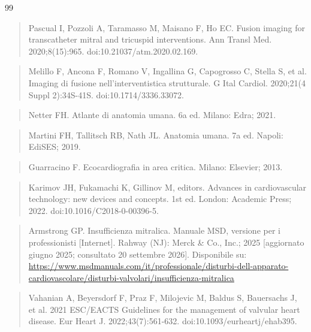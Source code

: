 \documentclass[12pt,a4paper,twoside]{article}
\providecommand{\ul}[1]{#1}
\begin{document}
\begin{thebibliography}{99}
  \begin{quote}
  Pascual I, Pozzoli A, Taramasso M, Maisano F, Ho EC. Fusion imaging for transcatheter mitral and tricuspid interventions. Ann Transl Med. 2020;8(15):965. doi:10.21037/atm.2020.02.169.
  \end{quote}
  \begin{quote}
  Melillo F, Ancona F, Romano V, Ingallina G, Capogrosso C, Stella S, et al. Imaging di fusione nell'interventistica strutturale. G Ital Cardiol. 2020;21(4 Suppl 2):34S-41S. doi:10.1714/3336.33072.
  \end{quote}
  \begin{quote}
  Netter FH. Atlante di anatomia umana. 6a ed. Milano: Edra; 2021.
  \end{quote}
  \begin{quote}
  Martini FH, Tallitsch RB, Nath JL. Anatomia umana. 7a ed. Napoli: EdiSES; 2019.
  \end{quote}
  \begin{quote}
  Guarracino F. Ecocardiografia in area critica. Milano: Elsevier; 2013.
  \end{quote}
  \begin{quote}
  Karimov JH, Fukamachi K, Gillinov M, editors. Advances in cardiovascular technology: new devices and concepts. 1st ed. London: Academic Press; 2022. doi:10.1016/C2018-0-00396-5.
  \end{quote}
  \begin{quote}
  Armstrong GP. Insufficienza mitralica. Manuale MSD, versione per i professionisti {[}Internet{]}. Rahway (NJ): Merck \& Co., Inc.; 2025 {[}aggiornato giugno 2025; consultato 20 settembre 2026{]}. Disponibile su: \href{https://www.msdmanuals.com/it/professionale/disturbi-dell-apparato-cardiovascolare/disturbi-valvolari/insufficienza-mitralica}{\ul{https://www.msdmanuals.com/it/professionale/disturbi-dell-apparato-cardiovascolare/disturbi-valvolari/insufficienza-mitralica}}
  \end{quote}
  \begin{quote}
  Vahanian A, Beyersdorf F, Praz F, Milojevic M, Baldus S, Bauersachs J, et al. 2021 ESC/EACTS Guidelines for the management of valvular heart disease. Eur Heart J. 2022;43(7):561-632. doi:10.1093/eurheartj/ehab395.
  \end{quote}
  \begin{quote}

\end{quote}
\end{thebibliography}
\end{document}
